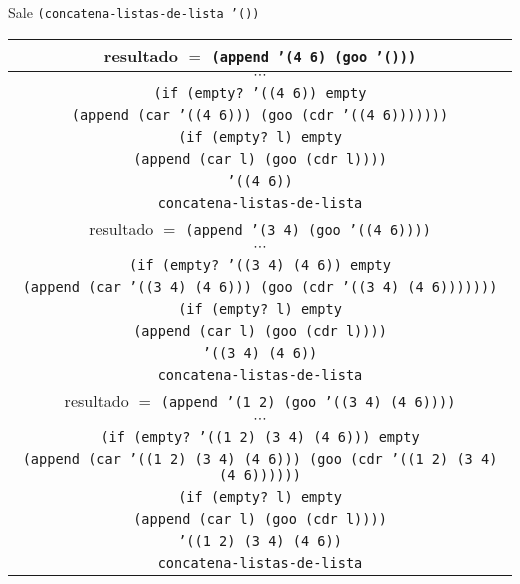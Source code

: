 \documentclass[letterpaper,11pt]{article}
\begin{document}
\begin{enumerate}
\begin{enumerate}
        \newpage
        Sale \texttt{(concatena-listas-de-lista '())}
        \begin{center}
            \begin{tabular}{|c|}
                \hline
                resultado $=$ \texttt{(append '(4 6) (goo '()))}  \\
                \hline
                $\cdots$ \\
                \hline
                \texttt{(if (empty? '((4 6)) empty} \\
                \texttt{(append (car '((4 6))) 
                (goo (cdr '((4 6)))))))} \\
                \hline
                \texttt{(if (empty? l) empty} \\
                \texttt{(append (car l) (goo (cdr l))))} \\
                \hline
                \texttt{'((4 6))} \\
                \hline
                \texttt{concatena-listas-de-lista} \\
                \hline
                \hline
                resultado $=$ \texttt{(append '(3 4) (goo '((4 6))))}  \\
                \hline
                $\cdots$ \\
                \hline
                \texttt{(if (empty? '((3 4) (4 6)) empty} \\
                \texttt{(append (car '((3 4) (4 6))) 
                (goo (cdr '((3 4) (4 6)))))))} \\
                \hline
                \texttt{(if (empty? l) empty} \\
                \texttt{(append (car l) (goo (cdr l))))} \\
                \hline
                \texttt{'((3 4) (4 6))} \\
                \hline
                \texttt{concatena-listas-de-lista} \\
                \hline
                \hline
                resultado $=$ \texttt{(append '(1 2) (goo '((3 4) (4 6))))}  \\
                \hline
                $\cdots$ \\
                \hline
                \texttt{(if (empty? '((1 2) (3 4) (4 6))) empty} \\
                \texttt{(append (car '((1 2) (3 4) (4 6))) 
                (goo (cdr '((1 2) (3 4) (4 6))))))} \\
                \hline
                \texttt{(if (empty? l) empty} \\
                \texttt{(append (car l) (goo (cdr l))))} \\
                \hline
                \texttt{'((1 2) (3 4) (4 6))} \\
                \hline
                \texttt{concatena-listas-de-lista} \\
                \hline
            \end{tabular}
        \end{center}


\end{enumerate}
\end{enumerate}
\end{document}
